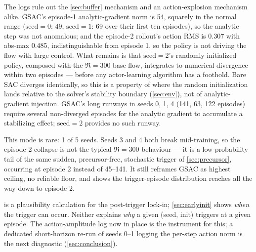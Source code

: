 The logs rule out the \cref{sec:buffer} mechanism and an action-explosion
mechanism alike. GSAC's episode-1 analytic-gradient norm is 54,
squarely in the normal range ($\text{seed}=0$: 49, $\text{seed}=1$: 69 over
their first ten episodes), so the analytic step was not anomalous; and the
episode-2 rollout's action RMS is 0.307 with abs-max 0.485,
indistinguishable from episode 1, so the policy is not driving the flow with
large control.
What remains is that $\text{seed}=2$'s randomly initialized policy, composed
with the $\Re=300$ base flow, integrates to numerical divergence within two
episodes --- before any actor-learning algorithm has a foothold. Bare SAC
diverges identically, so this is a property of where the random
initialization lands relative to the solver's stability boundary
(\cref{sec:env}), not of analytic-gradient injection. GSAC's long runways in
seeds 0, 1, 4 (141, 63, 122 episodes) require several non-diverged episodes
for the analytic gradient to accumulate a stabilizing effect; $\text{seed}=2$
provides no such runway.

This mode is rare: 1 of 5 seeds. Seeds 3 and 4 both break
mid-training, so the episode-2 collapse is not the typical $\Re=300$
behaviour --- it is a low-probability tail of the same sudden,
precursor-free, stochastic trigger of \cref{sec:precursor}, occurring at
episode 2 instead of 45--141. It still reframes GSAC as highest
ceiling, no reliable floor, and shows the trigger-episode distribution
reaches all the way down to episode 2.

 is a plausibility calculation
for the post-trigger lock-in; \cref{sec:earlyinit} shows \emph{when} the
trigger can occur. Neither explains \emph{why} a given (seed, init) triggers
at a given episode. The action-amplitude log now in place is the instrument
for this; a dedicated short-horizon re-run of seeds 0--1 logging the per-step
action norm is the next diagnostic (\cref{sec:conclusion}).
